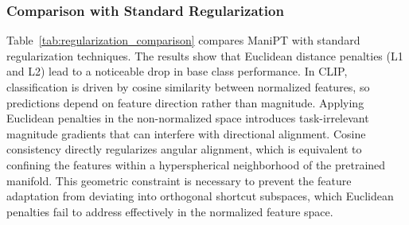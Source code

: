 \documentclass{article}
\theoremstyle{plain}
\theoremstyle{definition}
\theoremstyle{remark}
\begin{document}
	\subsubsection{Comparison with Standard Regularization}
	\begin{table}[h]
		\caption{Comparison with standard regularization methods. L1 and L2 denote constraining the distance between prompt-adapted features and pretrained features via L1 and L2 distances, respectively.}
		\label{tab:regularization_comparison}
		\centering
	\end{table}
	Table~\ref{tab:regularization_comparison} compares ManiPT with standard regularization techniques. The results show that Euclidean distance penalties (L1 and L2) lead to a noticeable drop in base class performance. In CLIP, classification is driven by cosine similarity between normalized features, so predictions depend on feature direction rather than magnitude. Applying Euclidean penalties in the non-normalized space introduces task-irrelevant magnitude gradients that can interfere with directional alignment. Cosine consistency directly regularizes angular alignment, which is equivalent to confining the features within a hyperspherical neighborhood of the pretrained manifold. This geometric constraint is necessary to prevent the feature adaptation from deviating into orthogonal shortcut subspaces, which Euclidean penalties fail to address effectively in the normalized feature space.
\end{document}
